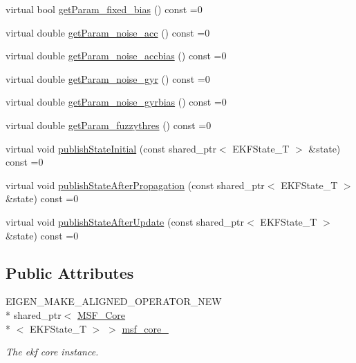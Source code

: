 \begin{DoxyCompactItemize}
\item 
virtual bool \hyperlink{classmsf__core_1_1MSF__SensorManager_a5eb7188dea0d2aa231732199fd06b988}{get\-Param\-\_\-fixed\-\_\-bias} () const =0
\item 
virtual double \hyperlink{classmsf__core_1_1MSF__SensorManager_a647bebf2feecd2929f58d6b4c8b3b319}{get\-Param\-\_\-noise\-\_\-acc} () const =0
\item 
virtual double \hyperlink{classmsf__core_1_1MSF__SensorManager_a7e7342acff24a4b5c5817903b2c8dfda}{get\-Param\-\_\-noise\-\_\-accbias} () const =0
\item 
virtual double \hyperlink{classmsf__core_1_1MSF__SensorManager_ae7b3b5a203fe118961ecdf28b49bfaa9}{get\-Param\-\_\-noise\-\_\-gyr} () const =0
\item 
virtual double \hyperlink{classmsf__core_1_1MSF__SensorManager_a8a5c694d3c6e5bd5bf4724269613bcb6}{get\-Param\-\_\-noise\-\_\-gyrbias} () const =0
\item 
virtual double \hyperlink{classmsf__core_1_1MSF__SensorManager_ab4498922d3d876ed9c4c5eeb7e090529}{get\-Param\-\_\-fuzzythres} () const =0
\item 
virtual void \hyperlink{classmsf__core_1_1MSF__SensorManager_ad851fff1bceaeb6696ef79a4792a317a}{publish\-State\-Initial} (const shared\-\_\-ptr$<$ E\-K\-F\-State\-\_\-\-T $>$ \&state) const =0
\item 
virtual void \hyperlink{classmsf__core_1_1MSF__SensorManager_a431f5b517c39fd9b2168857ae9513f8b}{publish\-State\-After\-Propagation} (const shared\-\_\-ptr$<$ E\-K\-F\-State\-\_\-\-T $>$ \&state) const =0
\item 
virtual void \hyperlink{classmsf__core_1_1MSF__SensorManager_abbce1dfe246d7c58ec94529d70c862e5}{publish\-State\-After\-Update} (const shared\-\_\-ptr$<$ E\-K\-F\-State\-\_\-\-T $>$ \&state) const =0
\end{DoxyCompactItemize}
\subsection*{Public Attributes}
\begin{DoxyCompactItemize}
\item 
E\-I\-G\-E\-N\-\_\-\-M\-A\-K\-E\-\_\-\-A\-L\-I\-G\-N\-E\-D\-\_\-\-O\-P\-E\-R\-A\-T\-O\-R\-\_\-\-N\-E\-W \\*
shared\-\_\-ptr$<$ \hyperlink{classmsf__core_1_1MSF__Core}{M\-S\-F\-\_\-\-Core}\\*
$<$ E\-K\-F\-State\-\_\-\-T $>$ $>$ \hyperlink{classmsf__core_1_1MSF__SensorManager_ad08942e66e76a572cd6425b79e653fd2}{msf\-\_\-core\-\_\-}
\begin{DoxyCompactList}\small\item\em The ekf core instance. \end{DoxyCompactList}\end{DoxyCompactItemize}

